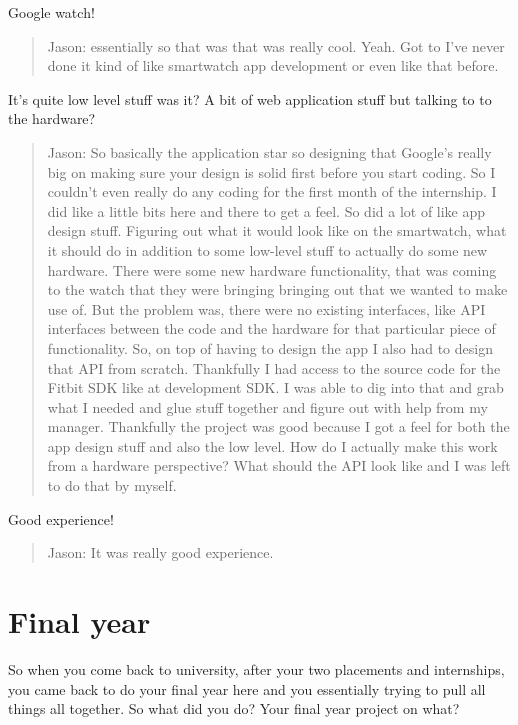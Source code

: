 \documentclass[
]{book}
\begin{document}
Google watch!

\begin{quote}
Jason: essentially so that was that was really cool. Yeah. Got to I've never done it kind of like smartwatch app development or even like that before.
\end{quote}

It's quite low level stuff was it? A bit of web application stuff but talking to to the hardware?

\begin{quote}
Jason: So basically the application star so designing that Google's really big on making sure your design is solid first before you start coding. So I couldn't even really do any coding for the first month of the internship. I did like a little bits here and there to get a feel. So did a lot of like app design stuff. Figuring out what it would look like on the smartwatch, what it should do in addition to some low-level stuff to actually do some new hardware. There were some new hardware functionality, that was coming to the watch that they were bringing bringing out that we wanted to make use of. But the problem was, there were no existing interfaces, like API interfaces between the code and the hardware for that particular piece of functionality. So, on top of having to design the app I also had to design that API from scratch. Thankfully I had access to the source code for the Fitbit SDK like at development SDK. I was able to dig into that and grab what I needed and glue stuff together and figure out with help from my manager. Thankfully the project was good because I got a feel for both the app design stuff and also the low level. How do I actually make this work from a hardware perspective? What should the API look like and I was left to do that by myself.
\end{quote}

Good experience!

\begin{quote}
Jason: It was really good experience.
\end{quote}

\hypertarget{jfinalyear}{%
\section{Final year}\label{jfinalyear}}

So when you come back to university, after your two placements and internships, you came back to do your final year here and you essentially trying to pull all things all together. So what did you do? Your final year project on what?
\end{document}
